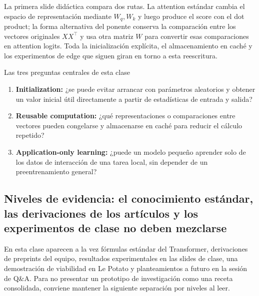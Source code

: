\documentclass[a4paper]{article}
\begin{document}
La primera slide didáctica compara dos rutas. La attention estándar cambia el espacio de representación mediante $W_q,W_k$ y luego produce el score con el dot product; la forma alternativa del ponente conserva la comparación entre los vectores originales $XX^\top$ y usa otra matriz $W$ para convertir esas comparaciones en attention logits. Toda la inicialización explícita, el almacenamiento en caché y los experimentos de edge que siguen giran en torno a esta reescritura.

\begin{importantbox}{Las tres preguntas centrales de esta clase}
\begin{enumerate}
  \item \textbf{Initialization:} ¿se puede evitar arrancar con parámetros aleatorios y obtener un valor inicial útil directamente a partir de estadísticas de entrada y salida?
  \item \textbf{Reusable computation:} ¿qué representaciones o comparaciones entre vectores pueden congelarse y almacenarse en caché para reducir el cálculo repetido?
  \item \textbf{Application-only learning:} ¿puede un modelo pequeño aprender solo de los datos de interacción de una tarea local, sin depender de un preentrenamiento general?
\end{enumerate}
\end{importantbox}


\subsection{Niveles de evidencia: el conocimiento estándar, las derivaciones de los artículos y los experimentos de clase no deben mezclarse}

En esta clase aparecen a la vez fórmulas estándar del Transformer, derivaciones de preprints del equipo, resultados experimentales en las slides de clase, una demostración de viabilidad en Le Potato y planteamientos a futuro en la sesión de Q\&A. Para no presentar un prototipo de investigación como una receta consolidada, conviene mantener la siguiente separación por niveles al leer.
\end{document}
